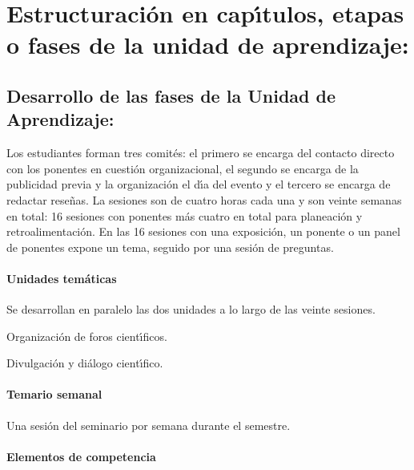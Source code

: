 \section{Estructuraci\'{o}n en cap\'{\i}tulos, etapas o fases de la unidad de
  aprendizaje:}

\subsection{Desarrollo de las fases de la Unidad de Aprendizaje:}

\quad

Los estudiantes forman tres comit\'{e}s: el primero se encarga del
contacto directo con los ponentes en cuesti\'{o}n organizacional, el
segundo se encarga de la publicidad previa y la organizaci\'{o}n el
d\'{\i}a del evento y el tercero se encarga de redactar rese\~{n}as.
La sesiones son de cuatro horas cada una y son veinte semanas en
total: 16 sesiones con ponentes m\'{a}s cuatro en total para
planeaci\'{o}n y retroalimentaci\'{o}n. En las 16 sesiones con una
exposici\'{o}n, un ponente o un panel de ponentes expone un tema,
seguido por una sesi\'{o}n de preguntas.

\paragraph{Unidades tem\'{a}ticas}

\quad

Se desarrollan en paralelo las dos unidades a lo largo de las veinte
sesiones.

\begin{description}[itemsep=-2pt]
\item[U1]{Organizaci\'{o}n de foros cient\'{\i}ficos.}
\item[U2]{Divulgaci\'{o}n y di\'{a}logo cient\'{\i}fico.}
\end{description}

\paragraph{Temario semanal}

\quad

Una sesi\'{o}n del seminario por semana durante el semestre.

\paragraph{Elementos de competencia}

